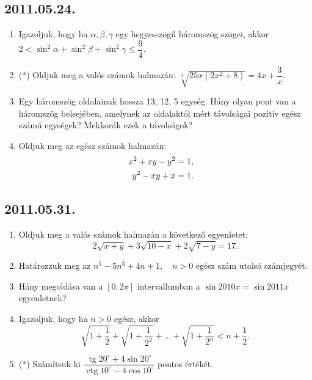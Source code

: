 \documentclass{article}
\newcommand{\tg}{\mathop{\mathrm{tg}}\nolimits}
\newcommand{\ctg}{\mathop{\mathrm{ctg}}\nolimits}
\begin{document}
\subsection*{2011.05.24.}
\begin{enumerate}
\item Igazoljuk, hogy ha $\alpha, \beta, \gamma$ egy hegyesszögű háromszög szögei, akkor $2<\sin^2 \alpha+\sin^2\beta+\sin^2\gamma\le\dfrac{9}{4}$.
\item ($*$) Oldjuk meg a valós számok halmazán: $\sqrt[3]{25x(2x^2+8)}=4x+\dfrac{3}{x}$.
\item Egy háromszög oldalainak hossza 13, 12, 5 egység. Hány olyan pont van a háromszög belsejében, amelynek az oldalaktól mért távolságai pozitív egész számú egységek? Mekkorák ezek a távolságok?
\item Oldjuk meg az egész számok halmazán:
\begin{align*}
x^2+xy-y^2&= 1,\cr
y^2-xy+x&=1.
\end{align*}
\end{enumerate}

\subsection*{2011.05.31.}
\begin{enumerate}
\item Oldjuk meg a valós számok halmazán a következő egyenletet:
$$2\sqrt{x+y}+3\sqrt{10-x}+2\sqrt{7-y}=17.$$
\item Határozzuk meg az $n^5-5n^3+4n+1,\quad n>0$ egész szám utolsó számjegyét.
\item Hány megoldása van a $[0;2\pi]$ intervallumban a $\sin 2010x=\sin 2011x$
egyenletnek?
\item Igazoljuk, hogy ha $n>0$ egész, akkor
$$\sqrt{1+\frac{1}{2}}+
\sqrt{1+\frac{1}{2^2}}+\ldots+
\sqrt{1+\frac{1}{2^n}}<n+\frac{1}{2}.
$$
\item ($*$) Számítsuk ki $\dfrac{\tg 20^\circ+4\sin 20^\circ}{\ctg 10^\circ-4\cos 10^\circ}$ pontos értékét.
\end{enumerate}
\end{document}
